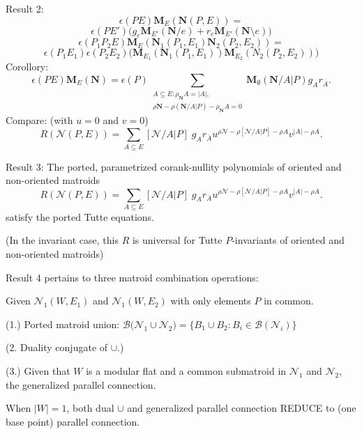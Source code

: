 \documentclass[%
  slidesonly,%
  semlayer,%
  amsmath
  ]{seminar}                                  %
\newcommand{\rank}{{\rho}}%
\newcommand{\Rank}{{\rho}}%
\newcommand{\Card}[1]{\ensuremath{{\left|#1\right|}}}
\newcommand{\ext}[1]{\ensuremath{\mathbf{#1}}}
\newcommand{\scomp}[1]{\ensuremath{\overline{#1}}}
\newcommand{\MVAR}[1]{{[#1]\;}}
\newcommand{\UNION}{\cup} %
\begin{document}
\begin{slide}
Result 2:
\[
   \epsilon(PE)\mathbf{M}_E(\mathbf{N}(P,E))=
\]
\[
   \epsilon(PE')\big(g_e\mathbf{M}_{E'}(\mathbf{N}/e) 
                + r_e\mathbf{M}_{E'}(\mathbf{N}\setminus e)\big)
\]
\[
   \epsilon(P_1P_2E)\mathbf{M}_E(\mathbf{N}_1(P_1,E_1)\mathbf{N}_2(P_2,E_2))
   =
\]
\[
   \epsilon(P_1E_1)\epsilon(P_2E_2)
   \big(\mathbf{M}_{E_1}(\mathbf{N}_1(P_1,E_1))\mathbf{M}_{E_2}({N}_2(P_2,E_2))\big)  
\]
Corollory:
\begin{equation}
\label{MESubsetSum}
\epsilon(PE)\ext{M}_E(\ext{N})=\epsilon(P)\sum_
             {\begin{array}{c}
                A\subseteq E:
	\rank_{\ext{N}}{A}=\Card{A},\\
	\rank{\ext{N}}-\rank{(\ext{N}/A|P)}-
        \rank_{\ext{N}}{A}=0
               \end{array}}
    \ext{M}_\emptyset(\ext{N}/A|P) g_Ar_{\scomp{A}}.
\end{equation}
Compare: (with $u=0$ and $v=0$)
\[
R(\mathcal{N}(P,E))=\sum_{A\subseteq E}
	\MVAR{\mathcal{N}/A|P}g_Ar_{\scomp{A}}
	u^{\Rank{\mathcal{N}}-\Rank{[\mathcal{N}/A|P]}-\Rank{A}}
	v^{\Card{A}-\Rank{A}}.
\]

\end{slide}

\begin{slide}
Result 3:  The ported, parametrized corank-nullity polynomials
of oriented and non-oriented matroids 
\[
R(\mathcal{N}(P,E))=\sum_{A\subseteq E}
	\MVAR{\mathcal{N}/A|P}g_Ar_{\scomp{A}}
	u^{\Rank{\mathcal{N}}-\Rank{[\mathcal{N}/A|P]}-\Rank{A}}
	v^{\Card{A}-\Rank{A}}.
\]
satisfy the ported Tutte equations.

(In the invariant case, this $R$ is universal for Tutte $P$-invariants
of oriented and non-oriented matroids)

\end{slide}

\begin{slide}
Result 4 pertains to three matroid combination operations:

Given $\mathcal{N}_1(W,E_1)$ and $\mathcal{N}_1(W,E_2)$ with
only elements $P$ in common.

(1.) Ported matroid union: $\mathcal{B}\big(\mathcal{N}_1\UNION\mathcal{N}_2\big) =
\{B_1\cup B_2 : B_i\in\mathcal{B}(\mathcal{N}_i)\}$

(2. Duality conjugate of $\UNION$.)

(3.) Given that $W$ is a modular flat and a common submatroid
in $\mathcal{N}_1$ and $\mathcal{N}_2$, the generalized parallel connection.

When $|W|=1$, both dual $\UNION$ and generalized parallel connection REDUCE
to (one base point) parallel connection.


\end{slide}
\end{document}
